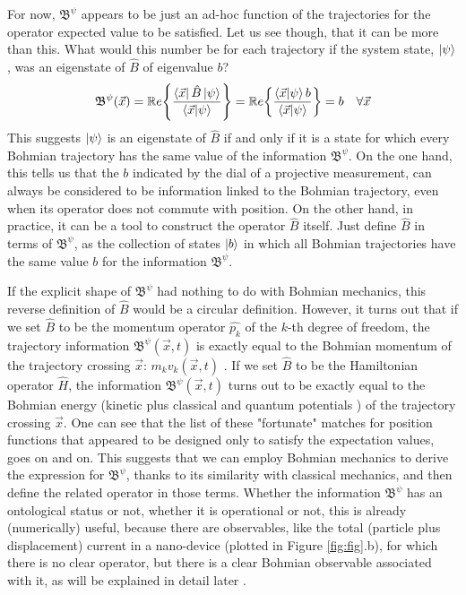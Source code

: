 \documentclass[11pt, a4paper]{article} %
\newcommand{\B}{\mathfrak{B}}
\begin{document}
For now, $\B^\psi$ appears to be just an ad-hoc function of the trajectories for the operator expected value to be satisfied. Let us see though, that it can be more than this. What would this number be for each trajectory if the system state, $\ket{\psi}$, was an eigenstate of $\hat{B}$ of eigenvalue $b$?\vspace{-0.1cm}
\begin{equation}
\B^\psi(\vec{x})=\mathbb{R}e\qty{ \frac{\bra{\vec{x}}\hat{B}\ket{\psi}}{\bra{\vec{x}}\ket{\psi}} } = \mathbb{R}e\qty{ \frac{\bra{\vec{x}}\ket{\psi}b}{\bra{\vec{x}}\ket{\psi}} }=b\quad \forall \vec{x}\vspace{-0.1cm}
\end{equation}
This suggests $\ket{\psi}$ is an eigenstate of $\hat{B}$ if and only if it is a state for which every Bohmian trajectory has the same value of the information $\B^\psi$. On the one hand, this tells us that the $b$ indicated by the dial of a projective measurement, can always be considered to be information linked to the Bohmian trajectory, even when its operator does not commute with position. On the other hand, in practice, it can be a tool to construct the operator $\hat{B}$ itself. Just define $\hat{B}$ in terms of $\B^\psi$, as the collection of states $\ket{b}$ in which all Bohmian trajectories have the same value $b$ for the information $\B^\psi$.

If the explicit shape of $\B^\psi$ had nothing to do with Bohmian mechanics, this reverse definition of $\hat{B}$ would be a circular definition. However, it turns out that if we set $\hat{B}$ to be the momentum operator $\hat{p_k}$ of the $k$-th degree of freedom, the trajectory information $\B^\psi(\vec{x},t)$ is exactly equal to the Bohmian momentum of the trajectory crossing $\vec{x}$: $m_k v_k(\vec{x},t)$ \cite{DevInPosition1}. If we set $\hat{B}$ to be the Hamiltonian operator $\hat{H}$, the information $\B^\psi(\vec{x},t)$ turns out to be exactly equal to the Bohmian energy (kinetic plus classical and quantum potentials \cite{JordiXavier}) of the trajectory crossing $\vec{x}$. One can see that the list of these "fortunate" matches for position functions that appeared to be designed only to satisfy the expectation values, goes on and on. This suggests that we can employ Bohmian mechanics to derive the expression for $\B^\psi$, thanks to its similarity with classical mechanics, and then define the related operator in those terms. Whether the information $\B^\psi$ has an ontological status or not, whether it is operational or not, this is already (numerically) useful, because there are observables, like the total (particle plus  displacement) current in a nano-device (plotted in Figure \ref{fig:fig}.b), for which there is no clear operator, but there is a clear Bohmian observable associated with it, as will be explained in detail later \cite{Pel, equiv}.
\end{document}
